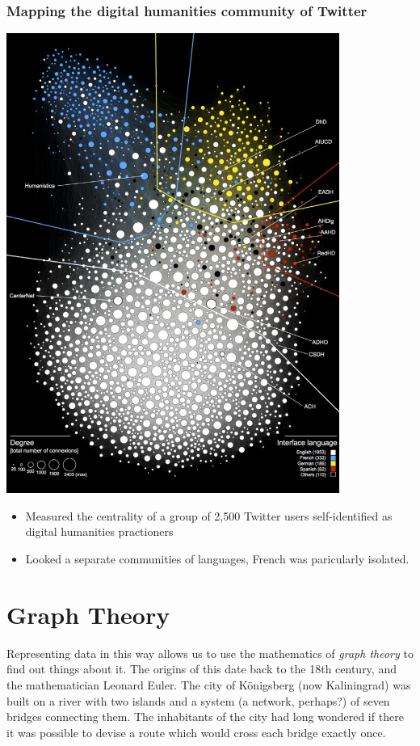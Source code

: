 \documentclass[
]{book}
\begin{document}
\hypertarget{mapping-the-digital-humanities-community-of-twitter}{%
\subsubsection{Mapping the digital humanities community of Twitter}\label{mapping-the-digital-humanities-community-of-twitter}}

\includegraphics{images/Screenshot 2022-10-03 at 11.46.29.png}

\begin{itemize}
\item
  Measured the centrality of a group of 2,500 Twitter users self-identified as digital humanities practioners
\item
  Looked a separate communities of languages, French was paricularly isolated.
\end{itemize}

\hypertarget{graph-theory}{%
\section{Graph Theory}\label{graph-theory}}

Representing data in this way allows us to use the mathematics of \emph{graph theory} to find out things about it. The origins of this date back to the 18th century, and the mathematician Leonard Euler. The city of Königsberg (now Kaliningrad) was built on a river with two islands and a system (a network, perhaps?) of seven bridges connecting them. The inhabitants of the city had long wondered if there it was possible to devise a route which would cross each bridge exactly once.
\end{document}
